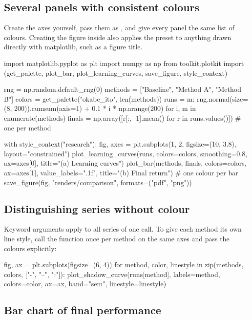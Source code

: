 \subsection{Several panels with consistent colours}

Create the axes yourself, pass them as , and give every panel the
same list of colours. Creating the figure inside  also
applies the preset to anything drawn directly with matplotlib, such as a
figure title.

\begin{pycode}
import matplotlib.pyplot as plt
import numpy as np
from toolkit.plotkit import (get_palette, plot_bar, plot_learning_curves,
                             save_figure, style_context)

rng = np.random.default_rng(0)
methods = ["Baseline", "Method A", "Method B"]
colors = get_palette("okabe_ito", len(methods))
runs = {m: rng.normal(size=(8, 200)).cumsum(axis=1) + 0.1 * i * np.arange(200)
        for i, m in enumerate(methods)}
finals = np.array([r[:, -1].mean() for r in runs.values()])     # one per method

with style_context("research"):
    fig, axes = plt.subplots(1, 2, figsize=(10, 3.8), layout="constrained")
    plot_learning_curves(runs, colors=colors, smoothing=0.8, ax=axes[0],
                         title="(a) Learning curves")
    plot_bar(methods, finals, colors=colors, ax=axes[1], value_labels=".1f",
             title="(b) Final return")          # one colour per bar
save_figure(fig, "renders/comparison", formats=("pdf", "png"))
\end{pycode}

\subsection{Distinguishing series without colour}

Keyword arguments apply to all series of one call. To give each method its
own line style, call the function once per method on the same axes and pass
the colours explicitly:

\begin{pycode}
fig, ax = plt.subplots(figsize=(6, 4))
for method, color, linestyle in zip(methods, colors, ["-", "--", ":"]):
    plot_shadow_curve(runs[method], labels=method, colors=color, ax=ax,
                      band="sem", linestyle=linestyle)
\end{pycode}

\subsection{Bar chart of final performance}

